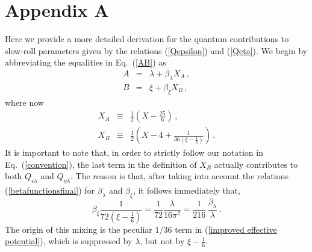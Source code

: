 \section*{Appendix A}
Here we provide a more detailed derivation for the quantum
contributions to slow-roll parameters given by the relations
(\ref{Qepsilon}) and (\ref{Qeta}). We begin by abbreviating
the equalities in Eq.~(\ref{AB}) as
\begin{eqnarray}
A &=& \lambda + \beta_{\lambda}X_A\,,\nonumber\\
B &=& \xi + \beta_{\xi}X_B\,,
\end{eqnarray}
where now
\begin{eqnarray}
X_A &\equiv& \frac12\left(X-\frac{25}{6}\right)\,,\nonumber\\
X_B &\equiv&
\frac12\left(X-4+\frac{1}{36\left(\xi-\frac16\right)}\right)\,.
\end{eqnarray}
It is important to note that, in order to strictly follow our
notation in Eq.~(\ref{convention}), the last term in the definition of
$X_B$ actually contributes to both $Q_{\epsilon\lambda}$ and
$Q_{\eta\lambda}$. The reason is that, after taking into account
the relations (\ref{betafunctionsfinal}) for $\beta_{\lambda}$ and
$\beta_{\xi}$, it follows immediately that,
\begin{equation}
\beta_{\xi}\frac{1}{72\left(\xi-\frac16\right)} =
\frac{1}{72}\frac{\lambda}{16\pi^2} =
\frac{1}{216}\,\frac{\beta_{\lambda}}{\lambda}\,.
\end{equation}
The origin of this mixing is the peculiar ${1}/{36}$ term in
(\ref{improved effective potential}), which is suppressed by
$\lambda$, but not by $\xi -\frac16$.

